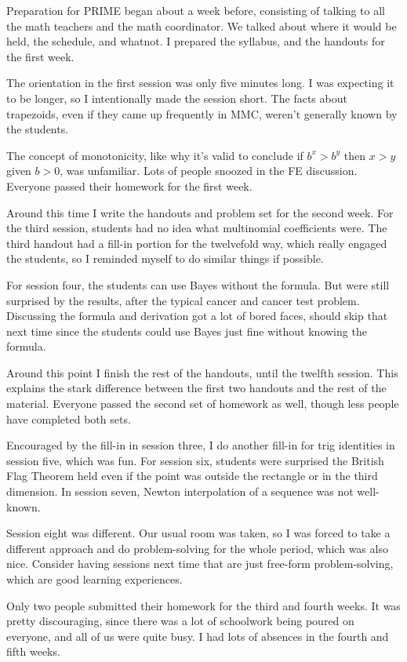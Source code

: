 \documentclass[11pt,paper=letter]{scrartcl}
\begin{document}
Preparation for PRIME began about a week before, consisting of talking to all the math teachers and the math coordinator. We talked about where it would be held, the schedule, and whatnot. I prepared the syllabus, and the handouts for the first week.

The orientation in the first session was only five minutes long. I was expecting it to be longer, so I intentionally made the session short. The facts about trapezoids, even if they came up frequently in MMC, weren't generally known by the students.

The concept of monotonicity, like why it's valid to conclude if $b^x > b^y$ then $x > y$ given $b > 0$, was unfamiliar. Lots of people snoozed in the FE discussion. Everyone passed their homework for the first week.

Around this time I write the handouts and problem set for the second week. For the third session, students had no idea what multinomial coefficients were. The third handout had a fill-in portion for the twelvefold way, which really engaged the students, so I reminded myself to do similar things if possible. 

For session four, the students can use Bayes without the formula. But were still surprised by the results, after the typical cancer and cancer test problem. Discussing the formula and derivation got a lot of bored faces, should skip that next time since the students could use Bayes just fine without knowing the formula.

Around this point I finish the rest of the handouts, until the twelfth session. This explains the stark difference between the first two handouts and the rest of the material. Everyone passed the second set of homework as well, though less people have completed both sets.

Encouraged by the fill-in in session three, I do another fill-in for trig identities in session five, which was fun. For session six, students were surprised the British Flag Theorem held even if the point was outside the rectangle or in the third dimension. In session seven, Newton interpolation of a sequence was not well-known. 

Session eight was different. Our usual room was taken, so I was forced to take a different approach and do problem-solving for the whole period, which was also nice. Consider having sessions next time that are just free-form problem-solving, which are good learning experiences.

Only two people submitted their homework for the third and fourth weeks. It was pretty discouraging, since there was a lot of schoolwork being poured on everyone, and all of us were quite busy. I had lots of absences in the fourth and fifth weeks.
\end{document}

